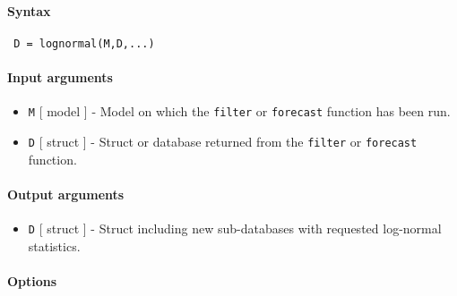 


	\paragraph{Syntax}
 
 \begin{verbatim}
 D = lognormal(M,D,...)
 \end{verbatim}
 
 \paragraph{Input arguments}
 
 \begin{itemize}
 \item
   \texttt{M} {[} model {]} - Model on which the \texttt{filter} or
   \texttt{forecast} function has been run.
 \item
   \texttt{D} {[} struct {]} - Struct or database returned from the
   \texttt{filter} or \texttt{forecast} function.
 \end{itemize}
 
 \paragraph{Output arguments}
 
 \begin{itemize}
 \item
   \texttt{D} {[} struct {]} - Struct including new sub-databases with
   requested log-normal statistics.
 \end{itemize}
 
 \paragraph{Options}
 
